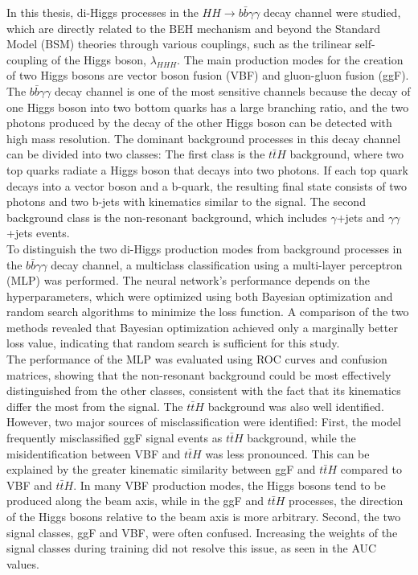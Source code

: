 \label{sec:conclusion}

In this thesis, di-Higgs processes in the $HH \rightarrow b \bar{b} \gamma \gamma$ decay channel were studied, which are directly related to the BEH mechanism and beyond the Standard Model (BSM)
theories through various couplings, such as the trilinear self-coupling of the Higgs boson, $\lambda_{HHH}$. The main production modes for the creation of two Higgs bosons are vector boson fusion (VBF)
and gluon-gluon fusion (ggF). \\

The $b \bar{b} \gamma \gamma$ decay channel is one of the most sensitive channels because the decay of one Higgs boson into two bottom quarks has a large branching ratio, and the two photons produced by the decay of the other Higgs boson
can be detected with high mass resolution. The dominant background processes in this decay channel can be divided into two classes: The first class is the $t \bar{t} H$ background, where two top quarks radiate a Higgs boson that
decays into two photons. If each top quark decays into a vector boson and a b-quark, the resulting final state consists of two photons and two b-jets with kinematics similar to the signal.
The second background class is the non-resonant background, which includes $\gamma$+jets and $\gamma\gamma$+jets events. \\

To distinguish the two di-Higgs production modes from background processes in the $b \bar{b} \gamma \gamma$ decay channel, a multiclass classification using a multi-layer perceptron (MLP) was performed.
The neural network's performance depends on the hyperparameters, which were optimized using both Bayesian optimization and random search algorithms to minimize the loss function.
A comparison of the two methods revealed that Bayesian optimization achieved only a marginally better loss value, indicating that random search is sufficient for this study. \\

The performance of the MLP was evaluated using ROC curves and confusion matrices, showing that the non-resonant background could be most effectively distinguished from the other classes, consistent with
the fact that its kinematics differ the most from the signal. The $t \bar{t} H$ background was also well identified. However, two major sources of
misclassification were identified: First, the model frequently misclassified ggF signal events as $t \bar{t} H$ background, while the misidentification between VBF and $t \bar{t} H$ was less pronounced. This can be explained by the greater kinematic similarity between ggF and $t \bar{t} H$ compared to VBF and $t \bar{t} H$. 
In many VBF production modes, the Higgs bosons tend to be produced along the beam axis, while in the ggF and $t \bar{t} H$ processes, the direction of the Higgs bosons relative to the beam axis
is more arbitrary. Second, the two signal classes, ggF and VBF, were often confused. Increasing the weights of the signal classes during training did not resolve this issue, as seen in the AUC values. \\

